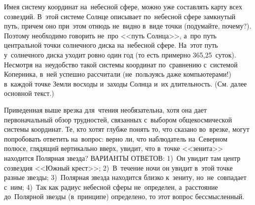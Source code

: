 Имея систему координат на~небесной сфере, можно уже составлять карту всех созвездий. В~этой системе
Солнце описывает по~небесной сфере замкнутый путь, причем оно при~этом отнюдь не~видно в~виде точки
(подумайте, почему?). Поэтому необходимо говорить не~про <<путь Солнца>>, а~про путь центральной
точки солнечного диска на~небесной сфере. На~этот путь у~солнечного диска уходит ровно один год (то
есть примерно 365,25~суток). Несмотря на~неудобство такой системы координат по~сравнению с~системой
Коперника, в~ней успешно рассчитали (не~пользуясь даже компьютерами!) в~каждой точке Земли восходы
и~заходы Солнца и~их длительность. (См. далее основной текст.)

\smallskip

\hrulefill

\medskip

Приведенная выше врезка для~чтения необязательна, хотя она дает первоначальный обзор трудностей,
связанных с~выбором общекосмической системы координат. Те, кто хотят глубже понять то, что сказано
во~врезке, могут попробовать ответить на~вопрос: верно ли, что наблюдатель на~Северном полюсе,
глядящий вертикально вверх, увидит, что в~точке <<зенита>> находится Полярная звезда? ВАРИАНТЫ
ОТВЕТОВ: 1)~Он увидит там центр созвездия <<Южный крест>>; 2)~В~течение ночи он увидит в~этой точке
разные звезды; 3)~Полярная звезда находится близко к~зениту, но~не~совпадает с~ним; 4)~Так как
радиус небесной сферы не~определен, а~расстояние до~Полярной звезды (в~принципе) определено, то
этот вопрос бессмысленный.

\pagebreak

